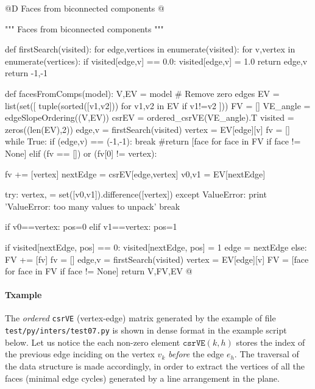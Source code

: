 \documentclass[11pt,oneside]{article}    %
\begin{document}
@D Faces from biconnected components
@{""" Faces from biconnected components """

def firstSearch(visited):
    for edge,vertices in enumerate(visited):
        for v,vertex in enumerate(vertices):
            if visited[edge,v] == 0.0:
                visited[edge,v] = 1.0
                return edge,v
    return -1,-1

def facesFromComps(model):
    V,EV = model
    # Remove zero edges
    EV = list(set([ tuple(sorted([v1,v2])) for v1,v2 in EV if v1!=v2 ]))
    FV = []
    VE_angle = edgeSlopeOrdering((V,EV))
    csrEV = ordered_csrVE(VE_angle).T
    visited = zeros((len(EV),2))
    edge,v = firstSearch(visited)
    vertex = EV[edge][v]
    fv = []
    while True:
        if (edge,v) == (-1,-1):
            break #return [face for face in FV if face != None]
        elif (fv == []) or (fv[0] != vertex):
            
            fv += [vertex]
            nextEdge = csrEV[edge,vertex]
            v0,v1 = EV[nextEdge]
            
            try:
                vertex, = set([v0,v1]).difference([vertex])
            except ValueError:
                print 'ValueError: too many values to unpack'
                break
                
            if v0==vertex: pos=0
            elif v1==vertex: pos=1
                        
            if visited[nextEdge, pos] == 0:
                visited[nextEdge, pos] = 1
                edge = nextEdge                
        else:
            FV += [fv]
            fv = []
            edge,v = firstSearch(visited)
            vertex = EV[edge][v]
        FV = [face for face in FV if face != None]
    return V,FV,EV
@}

\paragraph{Txample}
The \emph{ordered} \texttt{csrVE} (vertex-edge) matrix generated by the example of file \texttt{test/py/inters/test07.py} is shown in dense format in the example script below.
Let us notice the each non-zero element $\texttt{csrVE}(k,h)$ stores the index of the previous edge 
inciding on the vertex $v_k$ \emph{before} the edge $e_h$. The traversal of the data structure is made accordingly, in order to extract the vertices of all the faces (minimal edge cycles) generated by a line arrangement in the plane.
\end{document}
